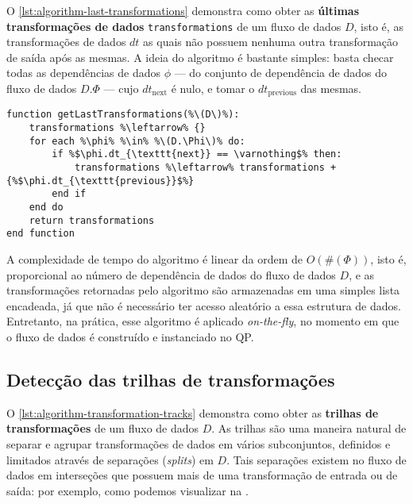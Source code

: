 O \autoref{lst:algorithm-last-transformations} demonstra como obter as \textbf{últimas transformações de dados} \texttt{transformations} de um fluxo de dados \( D \), isto é, as transformações de dados \(dt\) as quais não possuem nenhuma outra transformação de saída após as mesmas. A ideia do algoritmo é bastante simples: basta checar todas as dependências de dados \( \phi \) --- do conjunto de dependência de dados do fluxo de dados \( D.\Phi \) --- cujo \( dt_{\textrm{next}} \) é nulo, e tomar o \( dt_{\textrm{previous}} \) das mesmas.

\begin{minipage}[c]{0.95\textwidth}
\begin{lstlisting}[language=pseudocode,label={lst:algorithm-last-transformations},caption={[Detecção das últimas transformações de dados]Detecção das útimas transformações de dados em uma especificação de fluxo de dados.}]
function getLastTransformations(%\(D\)%):
    transformations %\leftarrow% {}
    for each %\phi% %\in% %\(D.\Phi\)% do:
        if %$\phi.dt_{\texttt{next}} == \varnothing$% then:
            transformations %\leftarrow% transformations + {%$\phi.dt_{\texttt{previous}}$%}
        end if
    end do
    return transformations
end function
\end{lstlisting}
\end{minipage}

A complexidade de tempo do algoritmo é linear da ordem de \( O(\#(\Phi)) \), isto é, proporcional ao número de dependência de dados do fluxo de dados \( D \), e as transformações retornadas pelo algoritmo são armazenadas em uma simples lista encadeada, já que não é necessário ter acesso aleatório a essa estrutura de dados. Entretanto, na prática, esse algoritmo é aplicado \textit{on-the-fly}, no momento em que o fluxo de dados é construído e instanciado no QP.

\subsection{Detecção das trilhas de transformações}

O \autoref{lst:algorithm-transformation-tracks} demonstra como obter as \textbf{trilhas de transformações} de um fluxo de dados \( D \). As trilhas são uma maneira natural de separar e agrupar transformações de dados em vários subconjuntos, definidos e limitados através de separações (\textit{splits}) em \( D \). Tais separações existem no fluxo de dados em interseções que possuem mais de uma transformação de entrada ou de saída: por exemplo, como podemos visualizar na .

